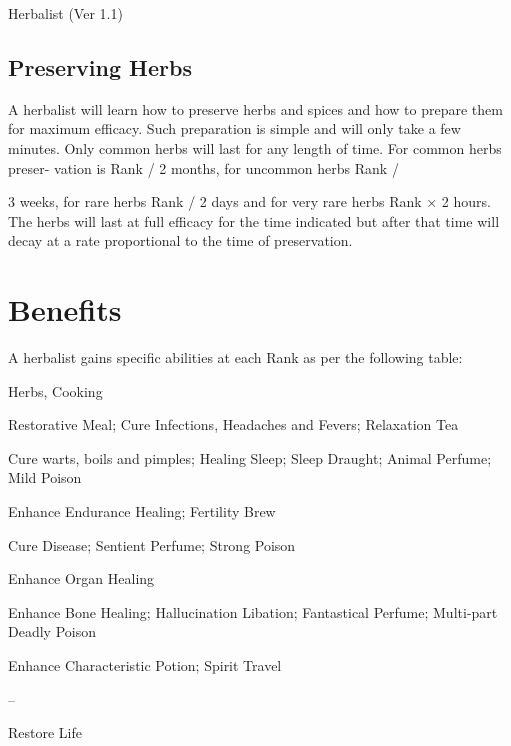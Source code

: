 \begin{Chapter}{Herbalist (Ver 1.1)}
\subsection{Preserving Herbs}

A herbalist will learn how to preserve herbs and spices and how to
prepare them for maximum efficacy.  Such preparation is simple and
will only take a few minutes.  Only common herbs will last for any
length of time.  For common herbs preser- vation is Rank / 2 months,
for uncommon herbs Rank /

3 weeks, for rare herbs Rank / 2 days and for very rare herbs Rank × 2
hours.  The herbs will last at full efficacy for the time indicated
but after that time will decay at a rate proportional to the time of
preservation.

\section{Benefits}

A herbalist gains specific abilities at each Rank as 
per the following table: 

\begin{Enumerate}\setcounter{enumi}{-1}
\item Herbs, Cooking

\item Restorative Meal; Cure Infections, Headaches and Fevers;
  Relaxation Tea

\item Cure warts, boils and pimples; Healing Sleep; Sleep Draught;
  Animal Perfume; Mild Poison

\item Enhance Endurance Healing; Fertility Brew

\item Cure Disease;
  Sentient Perfume; Strong Poison 

\item Enhance Organ Healing

\item Enhance Bone Healing; Hallucination Libation; Fantastical
  Perfume; Multi-part Deadly Poison

\item Enhance Characteristic Potion; Spirit Travel

\item – 

\item Restore Life

\end{Enumerate}


\end{Chapter}
